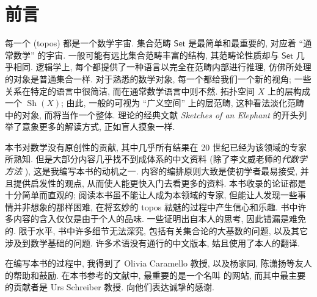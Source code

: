 \chapter{前言}


每一个\topos{} (topos) 都是一个数学宇宙. 集合范畴 $\mathsf {Set}$ 是最简单和最重要的\topos{}, 对应着 ``通常数学'' 的宇宙. 一般\topos{}可能有远比集合范畴丰富的结构, 其范畴论性质却与 $\mathsf {Set}$ 几乎相同. 逻辑学上, 每个\topos{}都提供了一种语言以完全在范畴内部进行推理, 仿佛所处理的对象是普通集合一样. 对于熟悉的数学对象, 每一个\topos{}都给我们一个新的视角; 一些关系在特定\topos{}的语言中很简洁, 而在通常数学语言中则不然. 拓扑空间 $X$ 上的层构成一个\topos{} $\operatorname{Sh}(X)$; 由此, 一般的\topos{}可视为 ``广义空间'' 上的层范畴, 这种看法淡化范畴中的对象, 而将\topos{}当作一个整体. \topos{}理论的经典文献 \textit{Sketches of an Elephant} \cite{Elephant} 的开头列举了意象更多的解读方式, 正如盲人摸象一样.

本书对数学没有原创性的贡献, 其中几乎所有结果在 20 世纪已经为该领域的专家所熟知. 但是大部分内容几乎找不到成体系的中文资料 (除了李文威老师的\emph{代数学方法} \cite{lww2}), 这是我编写本书的动机之一. 内容的编排原则大致是使初学者最易接受, 并且提供启发性的观点, 从而使人能更快入门去看更多的资料. 本书收录的论证都是十分简单而直观的; 阅读本书虽不能让人成为本领域的专家, 但能让人发现一些事情并非想象的那样困难, 在将玄妙的 topos 祛魅的过程中产生信心和乐趣. 书中许多内容的含入仅仅是由于个人的品味. 一些证明出自本人的思考, 因此错漏是难免的. 限于水平, 书中许多细节无法深究, 包括有关集合论的大基数的问题, 以及其它涉及到数学基础的问题. 许多术语没有通行的中文版本, 姑且使用了本人的翻译.

在编写本书的过程中, 我得到了 Olivia Caramello 教授, 以及杨家同, 陈潇扬等友人的帮助和鼓励. 在本书参考的文献中, 最重要的是一个名叫 \nlab 的网站, 而其中最主要的贡献者是 Urs Schreiber 教授. 向他们表达诚挚的感谢.

\newpage

~\vspace{4em}



